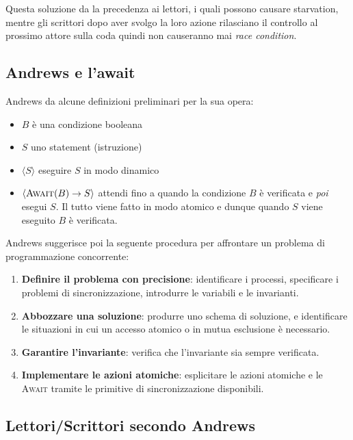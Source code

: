 \documentclass{article}
\begin{document}
Questa soluzione da la precedenza ai lettori, i quali possono causare starvation,
mentre gli scrittori dopo aver svolgo la loro azione rilasciano il controllo al
prossimo attore sulla coda quindi non causeranno mai \emph{race condition}.

\subsection{Andrews e l'await}

Andrews da alcune definizioni preliminari per la sua opera:
\begin{itemize}
  \item $B$ \`e una condizione booleana
  \item $S$ uno statement (istruzione)
  \item $\langle S \rangle$ eseguire $S$ in modo dinamico
  \item $\langle \textsc{Await}(B) \rightarrow S \rangle$ attendi fino a quando
    la condizione $B$ \`e verificata e \emph{poi} esegui $S$. Il tutto viene
    fatto in modo atomico e dunque quando $S$ viene eseguito $B$ \`e verificata.
\end{itemize}

Andrews suggerisce poi la seguente procedura per affrontare un problema di
programmazione concorrente:
\begin{enumerate}
  \item \textbf{Definire il problema con precisione}: identificare i processi,
    specificare i problemi di sincronizzazione, introdurre le variabili e le invarianti.
  \item \textbf{Abbozzare una soluzione}: produrre uno schema di soluzione, e
    identificare le situazioni in cui un accesso atomico o in mutua esclusione
    \`e necessario.
  \item \textbf{Garantire l'invariante}: verifica che l'invariante sia sempre
    verificata.
  \item \textbf{Implementare le azioni atomiche}: esplicitare le azioni atomiche
    e le \textsc{Await} tramite le primitive di sincronizzazione disponibili.
\end{enumerate}

\subsection{Lettori/Scrittori secondo Andrews}
\end{document}
